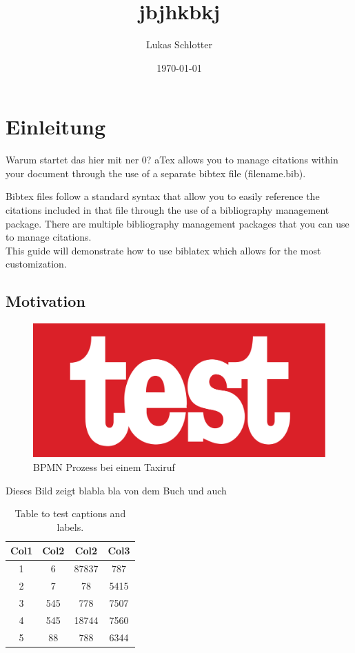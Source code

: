 \documentclass[ a4paper,
                oneside,
                toc=bibliography,
                toc=listof
                ]{scrbook}
\author{Lukas Schlotter}
\title{jbjhkbkj}
\date{\today}
\begin{document}
 
    \frontmatter
    \makeISWtitle
    
    \cleardoublepage
	\setcounter{page}{1} %

    
    \cleardoublepage
    \tableofcontents
    

    \mainmatter
    
    \chapter{Einleitung}
    Warum startet das hier mit ner 0?
    aTex allows you to manage citations within your document through the use of a separate bibtex file (filename.bib).
    
    
    \newpage
    
    Bibtex files follow a standard syntax that allow you to easily reference the citations included in that file through the use of a bibliography management package. There are multiple bibliography management packages that you can use to manage citations. \\
    This guide will demonstrate how to use biblatex which allows for the most customization.
    \section{Motivation}
    \begin{figure}[h]
    	\centering
    	\includegraphics[width=1.0\linewidth]{./images/Test}
    	\caption{BPMN Prozess bei einem Taxiruf}
    	\label{fig:bpmn prozess}
    \end{figure}
    Dieses Bild zeigt blabla bla von dem Buch \cite{Tantau2013} und auch \cite{Kohm2013}
    
    \begin{table}[h!]
    	\centering
    	\begin{tabular}{||c c c c||} 
    		\hline
    		Col1 & Col2 & Col2 & Col3 \\ [0.5ex] 
    		\hline\hline
    		1 & 6 & 87837 & 787 \\ 
    		2 & 7 & 78 & 5415 \\
    		3 & 545 & 778 & 7507 \\
    		4 & 545 & 18744 & 7560 \\
    		5 & 88 & 788 & 6344 \\ [1ex] 
    		\hline
    	\end{tabular}
    	\caption{Table to test captions and labels.}
    	\label{table:1}
    \end{table}
\end{document}
